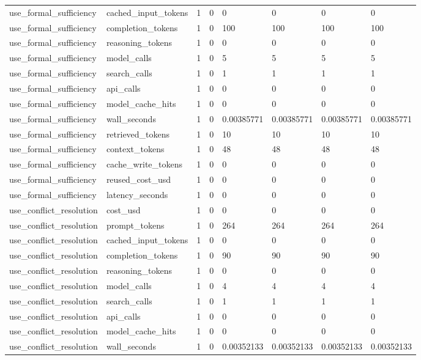 \begin{tabular}{llllllll}
use\_formal\_sufficiency & cached\_input\_tokens & 1 & 0 & 0 & 0 & 0 & 0 \\
use\_formal\_sufficiency & completion\_tokens & 1 & 0 & 100 & 100 & 100 & 100 \\
use\_formal\_sufficiency & reasoning\_tokens & 1 & 0 & 0 & 0 & 0 & 0 \\
use\_formal\_sufficiency & model\_calls & 1 & 0 & 5 & 5 & 5 & 5 \\
use\_formal\_sufficiency & search\_calls & 1 & 0 & 1 & 1 & 1 & 1 \\
use\_formal\_sufficiency & api\_calls & 1 & 0 & 0 & 0 & 0 & 0 \\
use\_formal\_sufficiency & model\_cache\_hits & 1 & 0 & 0 & 0 & 0 & 0 \\
use\_formal\_sufficiency & wall\_seconds & 1 & 0 & 0.00385771 & 0.00385771 & 0.00385771 & 0.00385771 \\
use\_formal\_sufficiency & retrieved\_tokens & 1 & 0 & 10 & 10 & 10 & 10 \\
use\_formal\_sufficiency & context\_tokens & 1 & 0 & 48 & 48 & 48 & 48 \\
use\_formal\_sufficiency & cache\_write\_tokens & 1 & 0 & 0 & 0 & 0 & 0 \\
use\_formal\_sufficiency & reused\_cost\_usd & 1 & 0 & 0 & 0 & 0 & 0 \\
use\_formal\_sufficiency & latency\_seconds & 1 & 0 & 0 & 0 & 0 & 0 \\
use\_conflict\_resolution & cost\_usd & 1 & 0 & 0 & 0 & 0 & 0 \\
use\_conflict\_resolution & prompt\_tokens & 1 & 0 & 264 & 264 & 264 & 264 \\
use\_conflict\_resolution & cached\_input\_tokens & 1 & 0 & 0 & 0 & 0 & 0 \\
use\_conflict\_resolution & completion\_tokens & 1 & 0 & 90 & 90 & 90 & 90 \\
use\_conflict\_resolution & reasoning\_tokens & 1 & 0 & 0 & 0 & 0 & 0 \\
use\_conflict\_resolution & model\_calls & 1 & 0 & 4 & 4 & 4 & 4 \\
use\_conflict\_resolution & search\_calls & 1 & 0 & 1 & 1 & 1 & 1 \\
use\_conflict\_resolution & api\_calls & 1 & 0 & 0 & 0 & 0 & 0 \\
use\_conflict\_resolution & model\_cache\_hits & 1 & 0 & 0 & 0 & 0 & 0 \\
use\_conflict\_resolution & wall\_seconds & 1 & 0 & 0.00352133 & 0.00352133 & 0.00352133 & 0.00352133 \\

\end{tabular}
